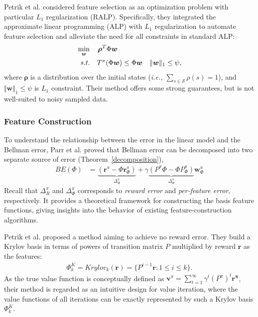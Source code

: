 \documentclass[onecolumn, conference]{IEEEtran}
\begin{document}
Petrik et al.\cite{Petrik2010FeatureSU} considered feature selection as an optimization problem with particular $L_1$ regularization (RALP). Specifically, they integrated the approximate linear programming (ALP) with $L_1$ regularization to automate feature selection and alleviate the need for all constraints in standard ALP:
\begin{equation*}
\begin{aligned}
&\min_{\boldsymbol{w}} \quad \boldsymbol{\rho}^T\Phi\boldsymbol{w}\\
&\begin{array}{r@{\quad}r@{}r@{\quad}r}
s.t. &T^\pi (\Phi\boldsymbol{w})\le \Phi \boldsymbol{w} \quad \Vert\boldsymbol{w}\Vert_{1} \le \psi,
\end{array}
\end{aligned}
\end{equation*}
where $\boldsymbol{\rho}$ is a distribution over the initial states (\textit{i.e.,} $\sum_{s\in \mathcal{S}} \rho(s)=1$), and $\Vert\boldsymbol{w}\Vert_{1}\le \psi$ is $L_1$ constraint. Their method offers some strong guarantees, but is not well-suited to noisy sampled data. 

\subsubsection{Feature Construction}\label{subsub:FC}To understand the relationship between the error in the linear model and the Bellman error, Parr et al. \cite{Parr2008AnAO} proved that Bellman error can be decomposed into two separate source of error (Theorem~\ref{decomposition}),
		\begin{equation*}
		\begin{split}
			BE(\Phi) &=   \underbrace{(\boldsymbol{r}^\pi - \Phi \boldsymbol{r}_\Phi^\pi)}_{\Delta_R^{\pi}} + \gamma \underbrace{(P^\pi \Phi - \Phi P_\Phi^\pi)}_{\Delta_\Phi^\pi}\boldsymbol{w}_\Phi^{\pi}
		\end{split}
		\end{equation*}
Recall that $\Delta_R^{\pi}$ and $\Delta_\Phi^\pi$ corresponds to \textit{reward error} and \textit{per-feature error}, respectively. It provides a theoretical framework for constructing the basis feature functions, giving insights into the behavior of existing feature-construction algorithms.

Petrik et al. \cite{Petrik2007AnAO} proposed a method aiming to achieve no reward error. They build a Krylov basis \cite{EtAl2007MatrixC3} in terms of powers of transition matrix $P$ multiplied by reward $\boldsymbol{r}$ as the features:
\begin{align*}
    \Phi^K_k = Krylov_k(\boldsymbol{r}) = \{P^{i-1}\boldsymbol{r}:1\le i \le k\}.
\end{align*}
As the true value function is conceptually defined as $\boldsymbol{v}^\pi = \sum_{t=1}^\infty \gamma^{t}(P^{\pi})^t\boldsymbol{r^\pi}$, their method is regarded as an intuitive design for value iteration, where the value functions of all iterations can be exactly represented by such a Krylov basis $\Phi_k^K$.
\end{document}
